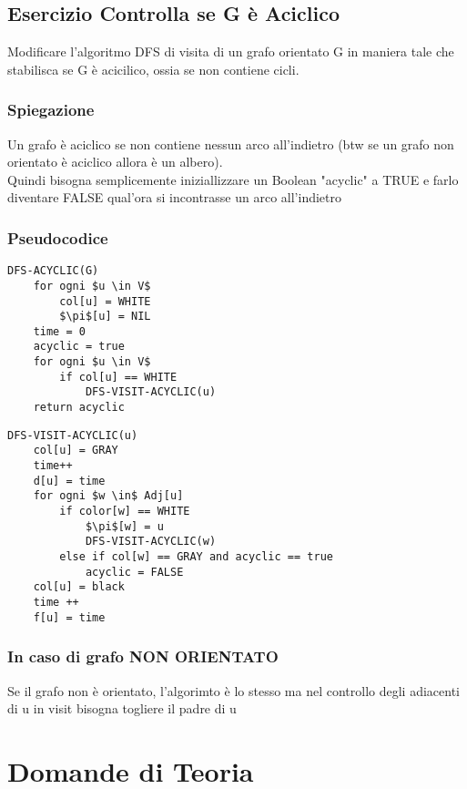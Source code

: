 \documentclass[12pt, a4paper, openany]{book}
\begin{document}
\section{Esercizio Controlla se G è Aciclico}
Modificare l’algoritmo DFS di visita di un grafo orientato G in maniera tale che stabilisca
se G è acicilico, ossia se non contiene cicli.
\subsection*{Spiegazione}
Un grafo è aciclico se non contiene nessun arco all'indietro (btw se un grafo non orientato è aciclico allora è un albero).
\\Quindi bisogna semplicemente iniziallizzare un Boolean "acyclic" a TRUE e farlo diventare FALSE qual'ora si incontrasse un arco all'indietro

\subsection*{Pseudocodice}
\begin{lstlisting}[mathescape=true]
DFS-ACYCLIC(G)
    for ogni $u \in V$
        col[u] = WHITE
        $\pi$[u] = NIL
    time = 0
    acyclic = true
    for ogni $u \in V$
        if col[u] == WHITE
            DFS-VISIT-ACYCLIC(u)
    return acyclic    
\end{lstlisting}

\begin{lstlisting}[mathescape=true]
DFS-VISIT-ACYCLIC(u)
    col[u] = GRAY
    time++
    d[u] = time
    for ogni $w \in$ Adj[u]
        if color[w] == WHITE
            $\pi$[w] = u
            DFS-VISIT-ACYCLIC(w)
        else if col[w] == GRAY and acyclic == true
            acyclic = FALSE
    col[u] = black
    time ++
    f[u] = time
\end{lstlisting}

\subsection*{In caso di grafo NON ORIENTATO}
Se il grafo non è orientato, l'algorimto è lo stesso ma nel controllo degli adiacenti di u in visit bisogna togliere il padre di u

\chapter{Domande di Teoria}
\end{document}
